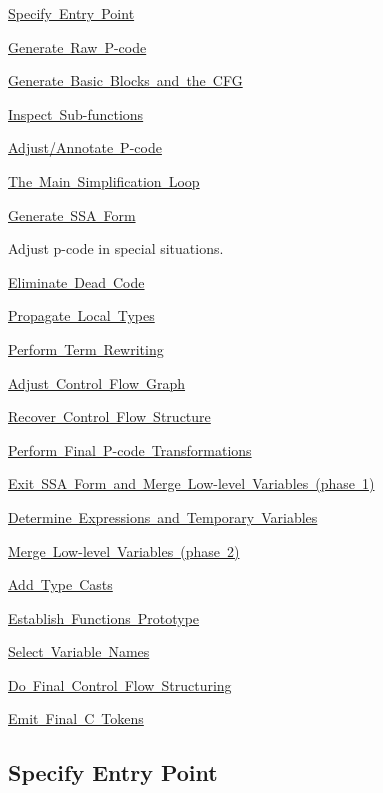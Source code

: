 \begin{DoxyEnumerate}
\item \mbox{\hyperlink{index_step0}{Specify Entry Point}}
\item \mbox{\hyperlink{index_step1}{Generate Raw P-\/code}}
\item \mbox{\hyperlink{index_step2}{Generate Basic Blocks and the C\+FG}}
\item \mbox{\hyperlink{index_step3}{Inspect Sub-\/functions}}
\item \mbox{\hyperlink{index_step4}{Adjust/\+Annotate P-\/code}}
\item \mbox{\hyperlink{index_step5}{The Main Simplification Loop}}
\begin{DoxyItemize}
\item \mbox{\hyperlink{index_step5a}{Generate S\+SA Form}}
\item Adjust p-\/code in special situations.
\item \mbox{\hyperlink{index_step5b}{Eliminate Dead Code}}
\item \mbox{\hyperlink{index_step5c}{Propagate Local Types}}
\item \mbox{\hyperlink{index_step5d}{Perform Term Rewriting}}
\item \mbox{\hyperlink{index_step5e}{Adjust Control Flow Graph}}
\item \mbox{\hyperlink{index_step5f}{Recover Control Flow Structure}}
\end{DoxyItemize}
\item \mbox{\hyperlink{index_step6}{Perform Final P-\/code Transformations}}
\item \mbox{\hyperlink{index_step7}{Exit S\+SA Form and Merge Low-\/level Variables (phase 1)}}
\item \mbox{\hyperlink{index_step8}{Determine Expressions and Temporary Variables}}
\item \mbox{\hyperlink{index_step9}{Merge Low-\/level Variables (phase 2)}}
\item \mbox{\hyperlink{index_step10}{Add Type Casts}}
\item \mbox{\hyperlink{index_step11}{Establish Function\textquotesingle{}s Prototype}}
\item \mbox{\hyperlink{index_step12}{Select Variable Names}}
\item \mbox{\hyperlink{index_step13}{Do Final Control Flow Structuring}}
\item \mbox{\hyperlink{index_step14}{Emit Final C Tokens}}
\end{DoxyEnumerate}\hypertarget{index_step0}{}\subsection{Specify Entry Point}\label{index_step0}
